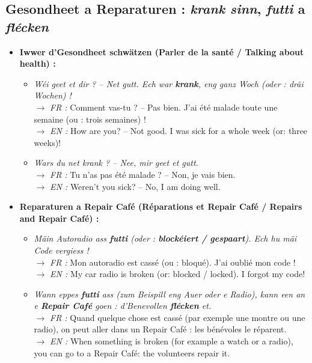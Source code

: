\subsection{Gesondheet a Reparaturen : \textit{krank sinn}, \textit{futti} a \textit{flécken}}

\begin{itemize}
    \item \textbf{Iwwer d'Gesondheet schwätzen (Parler de la santé / Talking about health) :}
    \begin{itemize}
        \item \textit{Wéi geet et dir ? -- Net gutt. Ech war \textbf{krank}, eng ganz Woch (oder : dräi Wochen) !} \\
        $\rightarrow$ \textit{FR :} Comment vas-tu ? -- Pas bien. J'ai été malade toute une semaine (ou : trois semaines) ! \\
        $\rightarrow$ \textit{EN :} How are you? -- Not good. I was sick for a whole week (or: three weeks)!
        \item \textit{Wars du net krank ? -- Nee, mir geet et gutt.} \\
        $\rightarrow$ \textit{FR :} Tu n'as pas été malade ? -- Non, je vais bien. \\
        $\rightarrow$ \textit{EN :} Weren't you sick? -- No, I am doing well.
    \end{itemize}

    \vspace{0.3em}

    \item \textbf{Reparaturen a Repair Café (Réparations et Repair Café / Repairs and Repair Café) :}
    \begin{itemize}
        \item \textit{Mäin Autoradio ass \textbf{futti} (oder : \textbf{blockéiert / gespaart}). Ech hu mäi Code vergiess !} \\
        $\rightarrow$ \textit{FR :} Mon autoradio est cassé (ou : bloqué). J'ai oublié mon code ! \\
        $\rightarrow$ \textit{EN :} My car radio is broken (or: blocked / locked). I forgot my code!
        \item \textit{Wann eppes \textbf{futti} ass (zum Beispill eng Auer oder e Radio), kann een an e \textbf{Repair Café} goen : d'Benevollen \textbf{flécken} et.} \\
        $\rightarrow$ \textit{FR :} Quand quelque chose est cassé (par exemple une montre ou une radio), on peut aller dans un Repair Café : les bénévoles le réparent. \\
        $\rightarrow$ \textit{EN :} When something is broken (for example a watch or a radio), you can go to a Repair Café: the volunteers repair it.
    \end{itemize}


\end{itemize}
